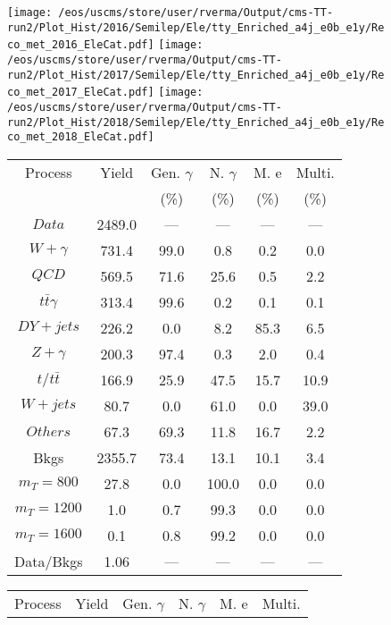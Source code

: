 \begin{figure}
\centering
\texttt{[image: /eos/uscms/store/user/rverma/Output/cms-TT-run2/Plot\_Hist/2016/Semilep/Ele/tty\_Enriched\_a4j\_e0b\_e1y/Reco\_met\_2016\_EleCat.pdf]}
\texttt{[image: /eos/uscms/store/user/rverma/Output/cms-TT-run2/Plot\_Hist/2017/Semilep/Ele/tty\_Enriched\_a4j\_e0b\_e1y/Reco\_met\_2017\_EleCat.pdf]}
\texttt{[image: /eos/uscms/store/user/rverma/Output/cms-TT-run2/Plot\_Hist/2018/Semilep/Ele/tty\_Enriched\_a4j\_e0b\_e1y/Reco\_met\_2018\_EleCat.pdf]}
\begin{minipage}[c]{0.32\textwidth}
\centering
\tiny{
\begin{tabular}{cccccc}
\hline
Process & Yield & Gen. $\gamma$ & N. $\gamma$ & M. e & Multi. \\
 &  & (\%) & (\%) & (\%) & (\%)  \\
\hline
                                                                      $ Data $ &  2489.0 &  --- &  --- &  --- &  ---\\
$ W+\gamma $ &  731.4 &  99.0 &  0.8 &  0.2 &  0.0\\
$ QCD $ &  569.5 &  71.6 &  25.6 &  0.5 &  2.2\\
$ t\bar{t}\gamma $ &  313.4 &  99.6 &  0.2 &  0.1 &  0.1\\
$ DY+jets $ &  226.2 &  0.0 &  8.2 &  85.3 &  6.5\\
$ Z+\gamma $ &  200.3 &  97.4 &  0.3 &  2.0 &  0.4\\
$ t/t\bar{t} $ &  166.9 &  25.9 &  47.5 &  15.7 &  10.9\\
$ W+jets $ &  80.7 &  0.0 &  61.0 &  0.0 &  39.0\\
$ Others $ &  67.3 &  69.3 &  11.8 &  16.7 &  2.2\\
Bkgs &  2355.7 &  73.4 &  13.1 &  10.1 &  3.4\\
$ m_{T} = 800 $ &  27.8 &  0.0 &  100.0 &  0.0 &  0.0\\
$ m_{T} = 1200 $ &  1.0 &  0.7 &  99.3 &  0.0 &  0.0\\
$ m_{T} = 1600 $ &  0.1 &  0.8 &  99.2 &  0.0 &  0.0\\
Data/Bkgs &  1.06 &  --- &  --- &  --- &  ---\\
\hline
\end{tabular}
}
\end{minipage}
\begin{minipage}[c]{0.32\textwidth}
\centering
\tiny{
\begin{tabular}{cccccc}
\hline
Process & Yield & Gen. $\gamma$ & N. $\gamma$ & M. e & Multi. \\

\end{tabular}}
\end{minipage}
\end{figure}
